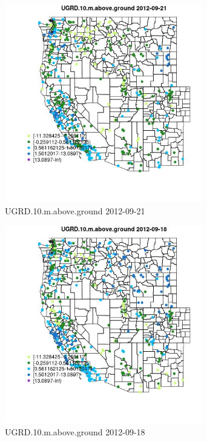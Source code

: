 \begin{figure} 
\centering  
\includegraphics[width=0.77\textwidth]{Code_Outputs/Report_ML_input_PM25_Step4_part_e_de_duplicated_aves_compiled_2019-05-14wNAs_MapObsUGRD10maboveground2012-09-21.jpg} 
\caption{\label{fig:Report_ML_input_PM25_Step4_part_e_de_duplicated_aves_compiled_2019-05-14wNAsMapObsUGRD10maboveground2012-09-21}UGRD.10.m.above.ground 2012-09-21} 
\end{figure} 
 

\clearpage 

\begin{figure} 
\centering  
\includegraphics[width=0.77\textwidth]{Code_Outputs/Report_ML_input_PM25_Step4_part_e_de_duplicated_aves_compiled_2019-05-14wNAs_MapObsUGRD10maboveground2012-09-18.jpg} 
\caption{\label{fig:Report_ML_input_PM25_Step4_part_e_de_duplicated_aves_compiled_2019-05-14wNAsMapObsUGRD10maboveground2012-09-18}UGRD.10.m.above.ground 2012-09-18} 
\end{figure} 
 

